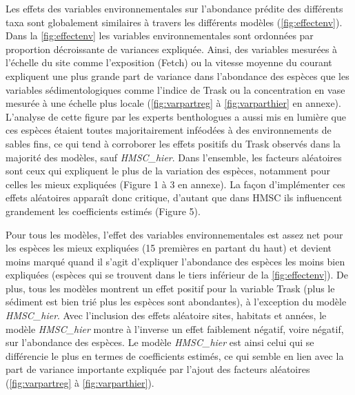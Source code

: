 \documentclass[12pt,]{article}
\begin{document}
Les effets des variables environnementales sur l'abondance prédite des
différents taxa sont globalement similaires à travers les différents
modèles (\cref{fig:effectenv}). Dans la \cref{fig:effectenv} les
variables environnementales sont ordonnées par proportion décroissante
de variances expliquée. Ainsi, des variables mesurées à l'échelle du
site comme l'exposition (Fetch) ou la vitesse moyenne du courant
expliquent une plus grande part de variance dans l'abondance des espèces
que les variables sédimentologiques comme l'indice de Trask ou la
concentration en vase mesurée à une échelle plus locale
(\cref{fig:varpartreg} à \ref{fig:varparthier} en annexe). L'analyse de
cette figure par les experts benthologues a aussi mis en lumière que ces
espèces étaient toutes majoritairement inféodées à des environnements de
sables fins, ce qui tend à corroborer les effets positifs du Trask
observés dans la majorité des modèles, sauf \emph{HMSC\_hier}. Dans
l'ensemble, les facteurs aléatoires sont ceux qui expliquent le plus de
la variation des espèces, notamment pour celles les mieux expliquées
(Figure 1 à 3 en annexe). La façon d'implémenter ces effets aléatoires
apparaît donc critique, d'autant que dans HMSC ils influencent
grandement les coefficients estimés (Figure 5).

Pour tous les modèles, l'effet des variables environnementales est assez
net pour les espèces les mieux expliquées (15 premières en partant du
haut) et devient moins marqué quand il s'agit d'expliquer l'abondance
des espèces les moins bien expliquées (espèces qui se trouvent dans le
tiers inférieur de la \cref{fig:effectenv}). De plus, tous les modèles
montrent un effet positif pour la variable Trask (plus le sédiment est
bien trié plus les espèces sont abondantes), à l'exception du modèle
\emph{HMSC\_hier}. Avec l'inclusion des effets aléatoire sites, habitats
et années, le modèle \emph{HMSC\_hier} montre à l'inverse un effet
faiblement négatif, voire négatif, sur l'abondance des espèces. Le
modèle \emph{HMSC\_hier} est ainsi celui qui se différencie le plus en
termes de coefficients estimés, ce qui semble en lien avec la part de
variance importante expliquée par l'ajout des facteurs aléatoires
(\cref{fig:varpartreg} à \ref{fig:varparthier}).
\end{document}
